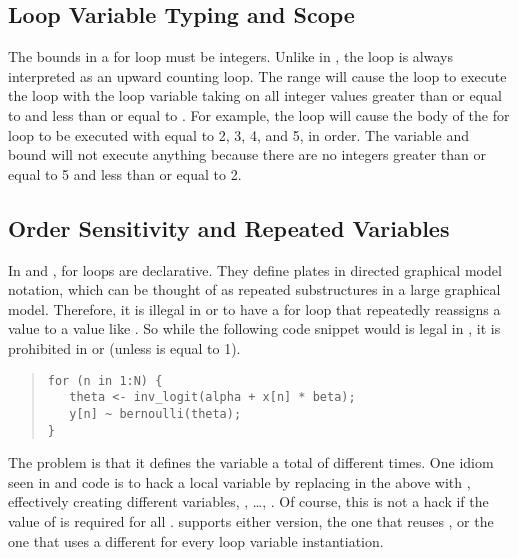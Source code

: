 \subsection{Loop Variable Typing and Scope}

The bounds in a for loop must be integers.  Unlike in \R, the loop is
always interpreted as an upward counting loop.  The range 
will cause the loop to execute the loop with the loop variable taking
on all integer values greater than or equal to  and less than
or equal to .  For example, the loop 
will cause the body of the for loop to be executed with  equal
to 2, 3, 4, and 5, in order.  The variable and bound  will not execute anything because there are no integers
greater than or equal to 5 and less than or equal to 2.

\subsection{Order Sensitivity and Repeated Variables}

In \BUGS and \JAGS, for loops are declarative.  They define plates in
directed graphical model notation, which can be thought of as repeated
substructures in a large graphical model.  Therefore, it is illegal in
\BUGS or \JAGS to have a for loop that repeatedly reassigns a value to
a value like .  So while the following code snippet would
is legal in \Stan, it is prohibited in \BUGS or \JAGS (unless 
is equal to 1).
%
\begin{quote}
\begin{Verbatim} 
for (n in 1:N) {
   theta <- inv_logit(alpha + x[n] * beta);
   y[n] ~ bernoulli(theta);
}
\end{Verbatim}
\end{quote}
% 
The problem is that it defines the variable  a total of
 different times.  One idiom seen in \BUGS and \JAGS code is
to hack a local variable by replacing  in the above with
, effectively creating  different variables,
, \ldots, .  Of course, this is not a
hack if the value of  is required for all .
\Stan supports either version, the one that reuses , or
the one that uses a different  for every loop variable
instantiation.  

